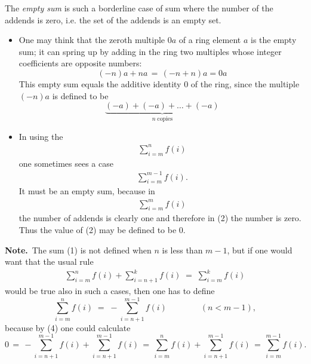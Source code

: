 \documentclass[12pt]{article}
\theoremstyle{definition}
\begin{document}
The {\em empty sum} is such a borderline case of sum where the number of the addends is zero, i.e. the set of the addends is an empty set.

\begin{itemize}

\item One may think that the zeroth multiple $0a$ of a ring element $a$ is the empty sum; it can spring up by adding in the ring two multiples whose integer coefficients are opposite numbers:
$$(-n)a\!+\!na \,=\, (-n\!+\!n)a = 0a$$
This empty sum equals the additive identity 0 of the ring, since the multiple $(-n)a$ is defined to be
$$\underbrace{(-a)\!+\!(-a)\!+\ldots+\!(-a)}_{n\; \mathrm{copies}}$$

\item In using the  
\begin{align}
\sum_{i=m}^nf(i)
\end{align}
one sometimes sees a case 
\begin{align}
\sum_{i=m}^{m-1}f(i).
\end{align}
It must be an empty sum, because in
\begin{align}
\sum_{i=m}^mf(i)
\end{align}
the number of addends is clearly one and therefore in (2) the number is zero.\, Thus the value of (2) may be defined to be 0.
\end{itemize}



\textbf{Note.}\, The sum (1) is not defined when $n$ is less than $m\!-\!1$, but if one would want that the usual rule
\begin{align}
\sum_{i=m}^nf(i)+\sum_{i=n+1}^kf(i) \;=\; \sum_{i=m}^kf(i)
\end{align}
would be true also in such a cases, then one has to define
$$\sum_{i=m}^nf(i) \;=\; -\sum_{i=n+1}^{m-1}f(i) \qquad\qquad(n < m\!-\!1),$$
because by (4) one could calculate
$$0 \,=\, -\sum_{i=n+1}^{m-1}f(i)+\sum_{i=n+1}^{m-1}f(i) \,=\,\sum_{i=m}^nf(i)+\sum_{i=n+1}^{m-1}f(i) 
\,=\, \sum_{i=m}^{m-1}f(i).$$


\end{document}
